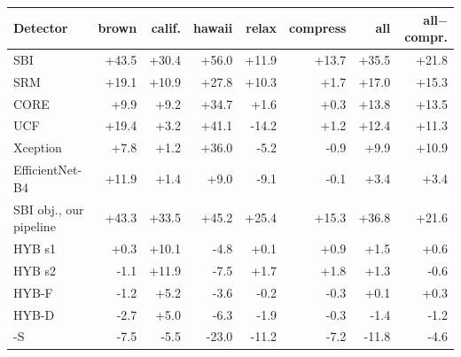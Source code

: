 \begin{tabular}{lrrrr|r|rr}
\toprule
Detector & brown & calif. & hawaii & relax & compress & all & all$-$compr. \\
\midrule
SBI & +43.5 & +30.4 & +56.0 & +11.9 & +13.7 & +35.5 & +21.8 \\
SRM & +19.1 & +10.9 & +27.8 & +10.3 & +1.7 & +17.0 & +15.3 \\
CORE & +9.9 & +9.2 & +34.7 & +1.6 & +0.3 & +13.8 & +13.5 \\
UCF & +19.4 & +3.2 & +41.1 & -14.2 & +1.2 & +12.4 & +11.3 \\
Xception & +7.8 & +1.2 & +36.0 & -5.2 & -0.9 & +9.9 & +10.9 \\
EfficientNet-B4 & +11.9 & +1.4 & +9.0 & -9.1 & -0.1 & +3.4 & +3.4 \\
\midrule
SBI obj., our pipeline & +43.3 & +33.5 & +45.2 & +25.4 & +15.3 & +36.8 & +21.6 \\
\ours{} HYB s1 & +0.3 & +10.1 & -4.8 & +0.1 & +0.9 & +1.5 & +0.6 \\
\ours{} HYB s2 & -1.1 & +11.9 & -7.5 & +1.7 & +1.8 & +1.3 & -0.6 \\
\ours{} HYB-F & -1.2 & +5.2 & -3.6 & -0.2 & -0.3 & +0.1 & +0.3 \\
\ours{} HYB-D & -2.7 & +5.0 & -6.3 & -1.9 & -0.3 & -1.4 & -1.2 \\
\ours{}-S & -7.5 & -5.5 & -23.0 & -11.2 & -7.2 & -11.8 & -4.6 \\
\bottomrule
\end{tabular}
